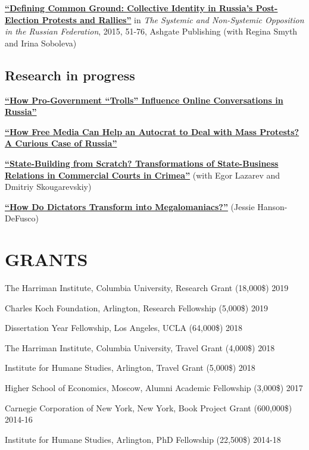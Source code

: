 \documentclass[11pt,]{article}
\begin{document}
\href{https://AntonSobolev.github.com/files/2013-Defining-Commong-Ground.pdf}{\textbf{``Defining
Common Ground: Collective Identity in Russia's Post-Election Protests
and Rallies''}} in \emph{The Systemic and Non-Systemic Opposition in the
Russian Federation}, 2015, 51-76, Ashgate Publishing (with Regina Smyth
and Irina Soboleva)

\hypertarget{research-in-progress}{%
\subsection{Research in progress}\label{research-in-progress}}

\protect\hyperlink{working}{\textbf{``How Pro-Government ``Trolls''
Influence Online Conversations in Russia''}}

\protect\hyperlink{working}{\textbf{``How Free Media Can Help an
Autocrat to Deal with Mass Protests? A Curious Case of Russia''}}

\protect\hyperlink{working}{\textbf{``State-Building from Scratch?
Transformations of State-Business Relations in Commercial Courts in
Crimea''}} (with Egor Lazarev and Dmitriy Skougarevskiy)

\protect\hyperlink{working}{\textbf{``How Do Dictators Transform into
Megalomaniacs?''}} (Jessie Hanson-DeFusco)

\hypertarget{grants}{%
\section{GRANTS}\label{grants}}

The Harriman Institute, Columbia University, Research Grant (18,000\$)
\hfill 2019

Charles Koch Foundation, Arlington, Research Fellowship (5,000\$)
\hfill 2019

Dissertation Year Fellowship, Los Angeles, UCLA (64,000\$) \hfill 2018

The Harriman Institute, Columbia University, Travel Grant (4,000\$)
\hfill 2018

Institute for Humane Studies, Arlington, Travel Grant (5,000\$)
\hfill 2018

Higher School of Economics, Moscow, Alumni Academic Fellowship (3,000\$)
\hfill 2017

Carnegie Corporation of New York, New York, Book Project Grant
(600,000\$) \hfill 2014-16

Institute for Humane Studies, Arlington, PhD Fellowship (22,500\$)
\hfill 2014-18
\end{document}
